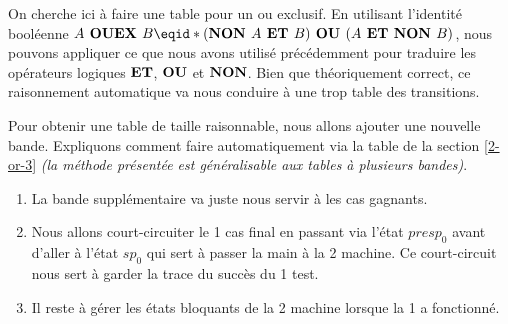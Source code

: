 On cherche ici à faire une table pour un ou exclusif.
En utilisant l'identité booléenne $A \boolope{ OUEX } B \eqid* (\boolope{NON } A \boolope{ ET } B) \boolope{ OU } (A \boolope{ ET NON } B)$, nous pouvons appliquer ce que nous avons utilisé précédemment pour traduire les opérateurs logiques $\text{\bfseries ET}$, $\text{\bfseries OU}$ et $\text{\bfseries NON}$.
Bien que théoriquement correct, ce raisonnement automatique va nous conduire à une trop  table des transitions.


\medskip


Pour obtenir une table de taille raisonnable, nous allons ajouter une nouvelle bande.
Expliquons comment faire automatiquement via la table  de la section \ref{2-or-3} \emph{(la méthode présentée est généralisable aux tables à plusieurs bandes)}.
\begin{enumerate}
	\item La bande supplémentaire va juste nous servir à  les cas gagnants.

	\item Nous allons court-circuiter le 1\ier{} cas final en passant via l'état $presp_0$ avant d'aller à l'état $sp_0$ qui sert à passer la main à la 2\ieme{} machine.
	      Ce court-circuit nous sert à garder la trace du succès du 1\ier{} test.

	\item Il reste à gérer les états bloquants de la 2\ieme{} machine lorsque la 1\iere{} a fonctionné.
\end{enumerate}


